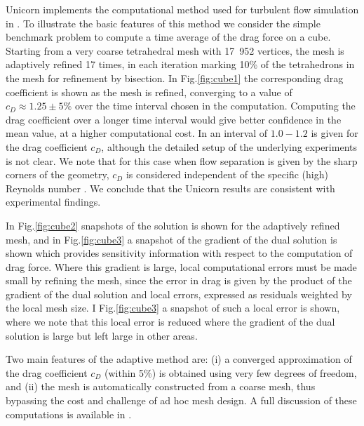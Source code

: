 Unicorn implements the computational method used for turbulent flow simulation in \cite{Hoffman2005,HoffmanJohnson2006b,Hoffman2006,Hoffman2009,HoffmanJansson2009,VilelaJanssonEtAl2010}.
To illustrate the basic features of this method we consider the simple benchmark problem to compute a time average of the drag force on a cube. Starting from a very coarse tetrahedral mesh with 17~952 vertices, the mesh is adaptively refined 17 times, in each iteration marking 10\% of the tetrahedrons in the mesh for refinement by bisection. In Fig.\ref{fig:cube1} the corresponding drag coefficient is shown as the mesh is refined, converging to a value of $c_D\approx 1.25\pm 5\%$ over the time interval chosen in the computation. Computing the drag coefficient over a longer time interval would give better confidence in the mean value, at a higher computational cost. In \cite{Mccormick1995} an interval of $1.0-1.2$ is given for the drag coefficient $c_D$, although the detailed setup of the underlying experiments is not clear. We note that for this case when flow separation is given by the sharp corners of the geometry, $c_D$ is considered independent of the specific (high) Reynolds number \cite{Mccormick1995}.
We conclude that the Unicorn results are consistent with experimental findings.

In Fig.\ref{fig:cube2} snapshots of the solution is shown for the adaptively refined mesh, and in
Fig.\ref{fig:cube3} a snapshot of the gradient of the dual solution is shown which provides sensitivity information with respect to the computation of drag force. Where this gradient is large, local computational errors must be made small by refining the mesh, since the error in drag is given by the product of the gradient of the dual solution and local errors, expressed as residuals weighted by the local mesh size. I Fig.\ref{fig:cube3} a snapshot of such a local error is shown, where we note that this local error is reduced where the gradient of the dual solution is large but left large in other areas.

Two main features of the adaptive method are: (i) a converged approximation of the drag coefficient $c_D$ (within 5\%) is obtained using very few degrees of freedom, and (ii) the mesh is automatically constructed from a coarse mesh, thus bypassing the cost and challenge of ad hoc mesh design. A full discussion of these computations is available in \cite{HoffmanJansson2011}.


